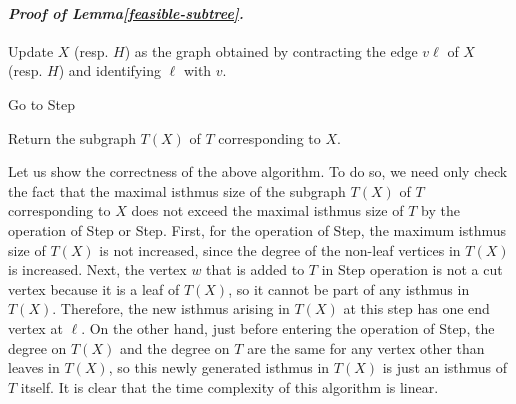 \documentclass[letter,11pt]{article}
\newcommand{\white}{\qquad{\framebox{\rule{0pt}{4pt}}}}
\newcommand{\owari}{\hfill\white}
\theoremstyle{definition}
\theoremstyle{definition}
\newcommand{\1}{\boldmath$~1~$\unboldmath}
\newcommand{\qedgo}{\vspace{0.35cm}}
\newcommand{\tume}{\hspace*{0.2em}}
\newcommand{\maru}[1]{{\ooalign{\hfill$\small#1$\hfill\crcr\scalebox{1.3}{$\bigcirc$}}}}
\newenvironment{alg-enumerate}{%
  \begin{enumerate}%
   \renewcommand{\theenumi}{\arabic{enumi}}%
   \renewcommand{\labelenumi}{\rm{{\maru{\theenumi}}\tume\/}}%
   \renewcommand{\labelenumii}{\rm{$(${\maru{\theenumi}}-\theenumii$)$\tume\/}}%
 }{\end{enumerate}%
}
\newenvironment{Proofof}[1]{\expandafter
\paragraph{{\it Proof of #1.}}}{\hspace{5mm}\owari\qedgo}
\begin{document}
\begin{Proofof}{Lemma\tume\ref{feasible-subtree}}
\begin{alg-enumerate}
{\begin{alg-enumerate}
\item{Update $X$ (resp. $H$) as the graph obtained by contracting the edge $v\ell$ of $X$ (resp. $H$) and identifying $\ell$ with $v$. }
\item{Go to Step\tume\maru{\ref{leaf-add}}}
\end{alg-enumerate}
}\label{spider}
\item{Return the subgraph $T(X)$ of $T$ corresponding to $X$.}
\end{alg-enumerate}


Let us show the correctness of the above algorithm. 
To do so, we need only check the fact that the maximal isthmus size of the subgraph $T(X)$ of $T$ corresponding to $X$ 
does not exceed the maximal isthmus size of $T$ by the operation of Step\tume{\maru{\ref{leaf-add}}} or Step\tume{\maru{\ref{spider}}}.
First, for the operation of Step\tume\maru{\ref{leaf-add}}, the maximum isthmus size of $T(X)$ is not increased, 
since the degree of the non-leaf vertices in $T(X)$ is increased.
Next, the vertex $w$ that is added to $T$ in Step\tume\maru{\ref{spider}} operation is not a cut vertex because it is a leaf of $T(X)$, 
so it cannot be part of any isthmus in $T(X)$.
Therefore, the new isthmus arising in $T(X)$ at this step has one end vertex at $\ell$. 
On the other hand, just before entering the operation of Step\tume\maru{\ref{spider}}, 
the degree on $T(X)$ and the degree on $T$ are the same for any vertex other than leaves 
in $T(X)$, so this newly generated isthmus in $T(X)$ is just an isthmus of $T$ itself. 
It is clear that the time complexity of this algorithm is linear. 
\end{Proofof}
\end{document}
